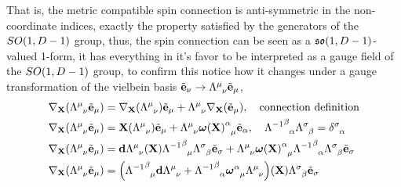 That is, the metric compatible spin connection is anti-symmetric in the non-coordinate indices, exactly the property 
satisfied by the generators of the $SO\qty(1,D-1)$ group, thus, the spin connection can be seen as a $\mathfrak{so}\qty(1,D-1)$-valued 1-form, it has 
everything in it's favor to be interpreted as a gauge field of the $SO\qty(1,D-1)$ group, to confirm this notice how it changes under a gauge transformation 
of the vielbein basis $\tilde{\vb e}_\nu\rightarrow\tensor{\Lambda}{^\mu_\nu}\tilde{\vb e}_\mu$,
\begin{align*}
    \nabla_{\vb X}\qty(\tensor{\Lambda}{^\mu_\nu}\tilde{\vb e}_\mu)&=\nabla_{\vb X }\qty(\tensor{\Lambda}{^\mu_\nu})\tilde{\vb e}_\mu+\tensor{\Lambda}{^\mu_\nu}\nabla_{\vb X}\qty(\tilde{\vb e}_\mu),\ \ \ \textnormal{connection definition}\\
    \nabla_{\vb X}\qty(\tensor{\Lambda}{^\mu_\nu}\tilde{\vb e}_\mu)&=\vb X\qty(\tensor{\Lambda}{^\mu_\nu})\tilde{\vb e}_\mu+\tensor{\Lambda}{^\mu_\nu}\tensor{{\boldsymbol\omega\qty(\vb X)}}{^\alpha_\mu}\tilde{\vb e}_\alpha,\ \ \ \tensor{{\Lambda^{-1}}}{^\beta_\alpha}\tensor{\Lambda}{^\sigma_\beta}=\tensor{\delta}{^\sigma_\alpha}\\
    \nabla_{\vb X}\qty(\tensor{\Lambda}{^\mu_\nu}\tilde{\vb e}_\mu)&=\vb d\tensor{\Lambda}{^\mu_\nu}\qty(\vb X)\tensor{{\Lambda^{-1}}}{^\beta_\mu}\tensor{\Lambda}{^\sigma_\beta}\tilde{\vb e}_\sigma+\tensor{\Lambda}{^\mu_\nu}\tensor{{\boldsymbol\omega\qty(\vb X)}}{^\alpha_\mu}\tensor{{\Lambda^{-1}}}{^\beta_\alpha}\tensor{\Lambda}{^\sigma_\beta}\tilde{\vb e}_\sigma\\
    \nabla_{\vb X}\qty(\tensor{\Lambda}{^\mu_\nu}\tilde{\vb e}_\mu)&=\qty(\tensor{{\Lambda^{-1}}}{^\beta_\mu}\vb d{\tensor{\Lambda}{^\mu_\nu}}+\tensor{{\Lambda^{-1}}}{^\beta_\alpha}\tensor{{\boldsymbol\omega}}{^\alpha_\mu}\tensor{\Lambda}{^\mu_\nu})\qty(\vb X)\tensor{\Lambda}{^\sigma_\beta}\tilde{\vb e}_\sigma
\end{align*}

